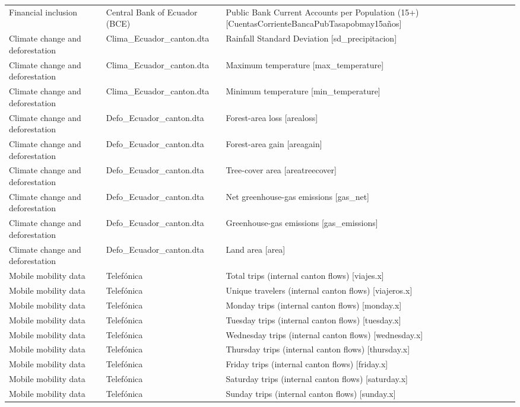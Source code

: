 \begin{landscape}
\begin{longtable}[t]{>{\raggedright\arraybackslash}p{3.4cm}>{\raggedright\arraybackslash}p{5.6cm}>{\raggedright\arraybackslash}p{12.4cm}}
Financial inclusion & Central Bank of Ecuador (BCE) & Public Bank Current Accounts per Population (15+) [CuentasCorrienteBancaP\allowbreak{}ubTasapobmay15años]\\
Climate change and deforestation & Clima\_Ecuador\_canton.dta & Rainfall Standard Deviation [sd\_precipitacion]\\
Climate change and deforestation & Clima\_Ecuador\_canton.dta & Maximum temperature [max\_temperature]\\
Climate change and deforestation & Clima\_Ecuador\_canton.dta & Minimum temperature [min\_temperature]\\
Climate change and deforestation & Defo\_Ecuador\_canton.dta & Forest-area loss [arealoss]\\
Climate change and deforestation & Defo\_Ecuador\_canton.dta & Forest-area gain [areagain]\\
Climate change and deforestation & Defo\_Ecuador\_canton.dta & Tree-cover area [areatreecover]\\
Climate change and deforestation & Defo\_Ecuador\_canton.dta & Net greenhouse-gas emissions [gas\_net]\\
Climate change and deforestation & Defo\_Ecuador\_canton.dta & Greenhouse-gas emissions [gas\_emissions]\\
Climate change and deforestation & Defo\_Ecuador\_canton.dta & Land area [area]\\
Mobile mobility data & Telefónica & Total trips (internal canton flows) [viajes.x]\\
Mobile mobility data & Telefónica & Unique travelers (internal canton flows) [viajeros.x]\\
Mobile mobility data & Telefónica & Monday trips (internal canton flows) [monday.x]\\
Mobile mobility data & Telefónica & Tuesday trips (internal canton flows) [tuesday.x]\\
Mobile mobility data & Telefónica & Wednesday trips (internal canton flows) [wednesday.x]\\
Mobile mobility data & Telefónica & Thursday trips (internal canton flows) [thursday.x]\\
Mobile mobility data & Telefónica & Friday trips (internal canton flows) [friday.x]\\
Mobile mobility data & Telefónica & Saturday trips (internal canton flows) [saturday.x]\\
Mobile mobility data & Telefónica & Sunday trips (internal canton flows) [sunday.x]\\

\end{longtable}
\end{landscape}
